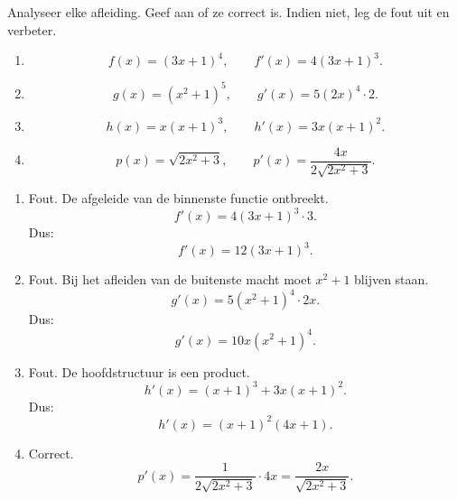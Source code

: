 \documentclass{ximera}
\begin{document}
\begin{oefening}{\oefU\ESS}

Analyseer elke afleiding.
Geef aan of ze correct is. Indien niet, leg de fout uit en verbeter.

\begin{enumerate}
  \item
  \[
  f(x)=(3x+1)^4,\qquad
  f'(x)=4(3x+1)^3.
  \]

  \item
  \[
  g(x)=(x^2+1)^5,\qquad
  g'(x)=5(2x)^4\cdot2.
  \]

  \item
  \[
  h(x)=x(x+1)^3,\qquad
  h'(x)=3x(x+1)^2.
  \]

  \item
  \[
  p(x)=\sqrt{2x^2+3},\qquad
  p'(x)=\frac{4x}{2\sqrt{2x^2+3}}.
  \]
\end{enumerate}

\begin{oplossing}
\begin{enumerate}
  \item Fout. De afgeleide van de binnenste functie ontbreekt.
  \[
  f'(x)=4(3x+1)^3\cdot3.
  \]
  Dus:
  \[\boxed{f'(x)=12(3x+1)^3.}\]

  \item Fout. Bij het afleiden van de buitenste macht moet $x^2+1$ blijven staan.
  \[
  g'(x)=5(x^2+1)^4\cdot2x.
  \]
  Dus:
  \[\boxed{g'(x)=10x(x^2+1)^4.}\]

  \item Fout. De hoofdstructuur is een product.
  \[
  h'(x)=(x+1)^3+3x(x+1)^2.
  \]
  Dus:
  \[\boxed{h'(x)=(x+1)^2(4x+1).}\]

  \item Correct.
  \[
  p'(x)=\frac{1}{2\sqrt{2x^2+3}}\cdot4x
  =\frac{2x}{\sqrt{2x^2+3}}.
  \]
\end{enumerate}
\end{oplossing}

\end{oefening}
\end{document}
